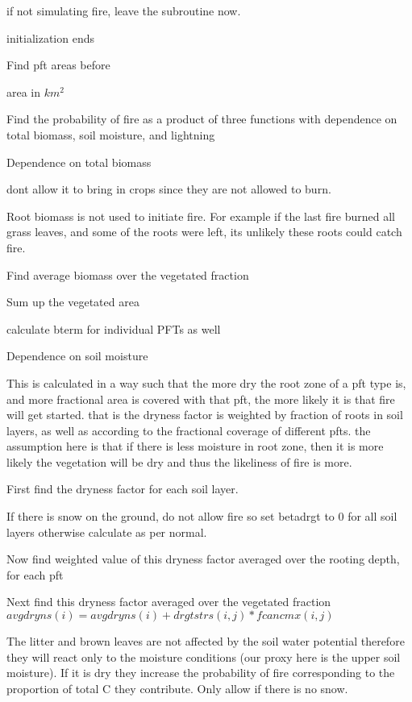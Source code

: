 if not simulating fire, leave the subroutine now.

initialization ends

Find pft areas before

area in $km^2$

Find the probability of fire as a product of three functions with dependence on total biomass, soil moisture, and lightning


\begin{DoxyEnumerate}
\item Dependence on total biomass
\end{DoxyEnumerate}

don\textquotesingle{}t allow it to bring in crops since they are not allowed to burn.

Root biomass is not used to initiate fire. For example if the last fire burned all grass leaves, and some of the roots were left, its unlikely these roots could catch fire.

Find average biomass over the vegetated fraction

Sum up the vegetated area

calculate bterm for individual P\+F\+Ts as well


\begin{DoxyEnumerate}
\item Dependence on soil moisture
\end{DoxyEnumerate}

This is calculated in a way such that the more dry the root zone of a pft type is, and more fractional area is covered with that pft, the more likely it is that fire will get started. that is the dryness factor is weighted by fraction of roots in soil layers, as well as according to the fractional coverage of different pfts. the assumption here is that if there is less moisture in root zone, then it is more likely the vegetation will be dry and thus the likeliness of fire is more.

First find the dryness factor for each soil layer.

If there is snow on the ground, do not allow fire so set betadrgt to 0 for all soil layers otherwise calculate as per normal.

Now find weighted value of this dryness factor averaged over the rooting depth, for each pft

Next find this dryness factor averaged over the vegetated fraction $avgdryns(i) = avgdryns(i) + drgtstrs(i,j)*fcancmx(i,j)$

The litter and brown leaves are not affected by the soil water potential therefore they will react only to the moisture conditions (our proxy here is the upper soil moisture). If it is dry they increase the probability of fire corresponding to the proportion of total C they contribute. Only allow if there is no snow.

